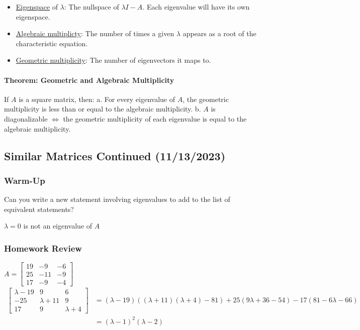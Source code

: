 \documentclass[
  letterpaper,
  DIV=11,
  numbers=noendperiod]{scrartcl}
\let\oldparagraph\paragraph
\renewcommand{\paragraph}[1]{\oldparagraph{#1}\mbox{}}
\providecommand{\tightlist}{%
  \setlength{\itemsep}{0pt}\setlength{\parskip}{0pt}}\usepackage{longtable,booktabs,array}
\begin{document}
\begin{itemize}
\tightlist
\item
  \ul{Eigenspace} of \(\lambda\): The nullspace of \(\lambda I - A\).
  Each eigenvalue will have its own eigenspace.
\item
  \ul{Algebraic multiplicty}: The number of times a given \(\lambda\)
  appears as a root of the characteristic equation.
\item
  \ul{Geometric multiplicity}: The number of eigenvectors it maps to.
\end{itemize}

\hypertarget{theorem-geometric-and-algebraic-multiplicity}{%
\paragraph{Theorem: Geometric and Algebraic
Multiplicity}\label{theorem-geometric-and-algebraic-multiplicity}}

If \(A\) is a square matrix, then: a. For every eigenvalue of \(A\), the
geometric multiplicity is less than or equal to the algebraic
multiplicity. b. \(A\) is diagonalizable \(\iff\) the geometric
multiplicity of each eigenvalue is equal to the algebraic multiplicity.

\hypertarget{similar-matrices-continued-11132023}{%
\subsection{Similar Matrices Continued
(11/13/2023)}\label{similar-matrices-continued-11132023}}

\hypertarget{warm-up}{%
\subsubsection{Warm-Up}\label{warm-up}}

Can you write a new statement involving eigenvalues to add to the list
of equivalent statements?

\(\lambda = 0\) is not an eigenvalue of \(A\)

\hypertarget{homework-review}{%
\subsubsection{Homework Review}\label{homework-review}}

\(A = \begin{bmatrix} 19 & -9 & -6 \\ 25 & -11 & -9 \\ 17 & -9 & -4 \end{bmatrix}\)
\begin{align*}
\begin{bmatrix}\lambda-19 & 9 & 6 \\ -25 & \lambda+11 & 9 \\ 17 & 9 & \lambda + 4\end{bmatrix}
&= (\lambda-19)((\lambda+11)(\lambda+4)-81) + 25(9\lambda+36-54) - 17(81-6\lambda-66) \\
&= (\lambda-1)^2(\lambda-2)
\end{align*}
\end{document}

